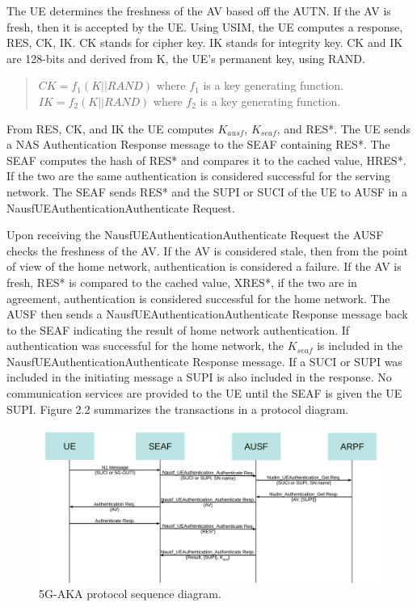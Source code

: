 \documentclass[11pt, pdftex]{article}
\begin{document}
The UE determines the freshness of the AV based off the AUTN.  If the AV is fresh, then it is accepted by the UE.  Using USIM, the UE computes a response, RES, CK, IK.  CK stands for cipher key.  IK stands for integrity key.  CK and IK are 128-bits and derived from K, the UE's permanent key, using RAND.  
\begin{quote}
	$CK = f_1(K||RAND) $ where $ f_1 $ is a key generating function.
	\newline
	$IK = f_2(K||RAND) $ where $ f_2 $ is a key generating function.
\end{quote} 
From RES, CK, and IK the UE computes $K_{ausf}$, $K_{seaf}$, and RES*.  The UE sends a NAS Authentication Response message to the SEAF containing RES*.  The SEAF computes the hash of RES* and compares it to the cached value, HRES*.  If the two are the same authentication is considered successful for the serving network.  The SEAF sends RES* and the SUPI or SUCI of the UE to AUSF in a Nausf\textunderscore UEAuthentication\textunderscore Authenticate Request.  

Upon receiving the Nausf\textunderscore UEAuthentication\textunderscore Authenticate Request the AUSF checks the freshness of the AV.  If the AV is considered stale, then from the point of view of the home network, authentication is considered a failure.  If the AV is fresh, RES* is compared to the cached value, XRES*, if the two are in agreement, authentication is considered successful for the home network.  The AUSF then sends a Nausf\textunderscore UEAuthentication\textunderscore Authenticate Response message back to the SEAF indicating the result of home network authentication.  If authentication was successful for the home network, the $K_{seaf}$ is included in the Nausf\textunderscore UEAuthentication\textunderscore Authenticate Response message.  If a SUCI or SUPI was included in the initiating message a SUPI is also included in the response.  No communication services are provided to the UE until the SEAF is given the UE SUPI.  Figure 2.2 summarizes the transactions in a protocol diagram.

\begin{figure}[h]
	\begin{center}
		\includegraphics[scale=0.21]{Figure2_2.png}
	\end{center}
	\caption{5G-AKA protocol sequence diagram.}
\end{figure}





     
\nocite{*}


\end{document}
